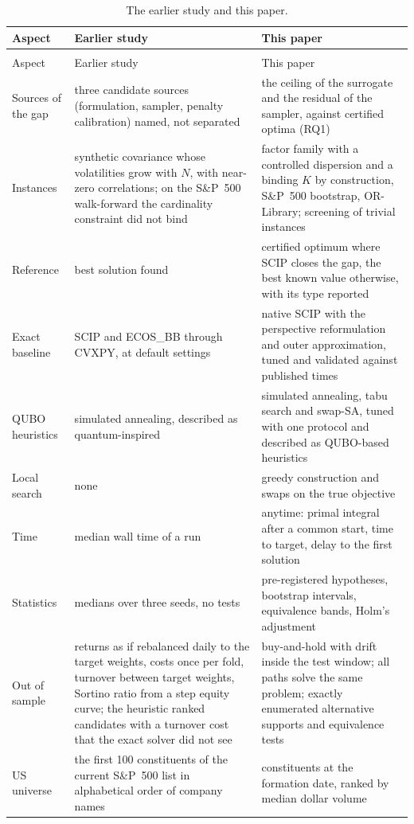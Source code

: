 {\footnotesize\setlength{\tabcolsep}{3pt}
\begin{longtable}{>{\raggedright\arraybackslash}p{}>{\raggedright\arraybackslash}p{}>{\raggedright\arraybackslash}p{}} %
\caption{The earlier study and this paper.}\label{tab:prior}\\
\toprule
Aspect & Earlier study & This paper \\
\midrule
\endfirsthead
\multicolumn{3}{l}{Table~\ref{tab:prior} (continued)}\\
\toprule
Aspect & Earlier study & This paper \\
\midrule
\endhead
\bottomrule
\endlastfoot
Sources of the gap & three candidate sources (formulation, sampler, penalty calibration) named, not separated &
the ceiling of the surrogate and the residual of the sampler, against certified optima (RQ1) \\
Instances & synthetic covariance whose volatilities grow with $N$, with near-zero correlations; on the S\&P~500
walk-forward the cardinality constraint did not bind & factor family with a controlled dispersion and a binding $K$ by
construction, S\&P~500 bootstrap, OR-Library; screening of trivial instances \\
Reference & best solution found & certified optimum where SCIP closes the gap, the best known value otherwise, with its
type reported \\
Exact baseline & SCIP and ECOS\_BB through CVXPY, at default settings & native SCIP with the perspective
reformulation and outer approximation, tuned and validated against published times \\
QUBO heuristics & simulated annealing, described as quantum-inspired & simulated annealing, tabu search and swap-SA,
tuned with one protocol and described as QUBO-based heuristics \\
Local search & none & greedy construction and swaps on the true objective \\
Time & median wall time of a run & anytime: primal integral after a common start, time to target, delay to the first
solution \\
Statistics & medians over three seeds, no tests & pre-registered hypotheses, bootstrap intervals, equivalence bands,
Holm's adjustment \\
Out of sample & returns as if rebalanced daily to the target weights, costs once per fold, turnover between target weights,
Sortino ratio from a step equity curve; the heuristic ranked candidates with a turnover cost that the exact solver did
not see & buy-and-hold with drift inside the test window; all paths solve the same problem; exactly enumerated
alternative supports and equivalence tests \\
US universe & the first 100 constituents of the current S\&P~500 list in alphabetical order of company names &
constituents at the formation date, ranked by median dollar volume \\
\end{longtable}}
